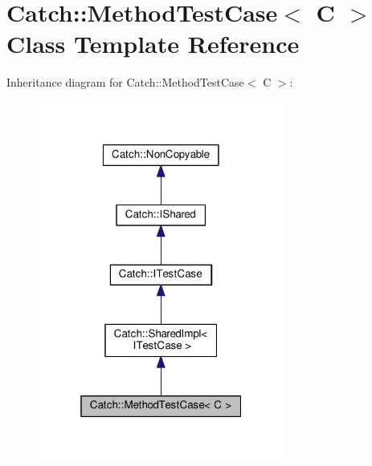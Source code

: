 \hypertarget{classCatch_1_1MethodTestCase}{}\section{Catch\+:\+:Method\+Test\+Case$<$ C $>$ Class Template Reference}
\label{classCatch_1_1MethodTestCase}


Inheritance diagram for Catch\+:\+:Method\+Test\+Case$<$ C $>$\+:
\nopagebreak
\begin{figure}[H]
\begin{center}
\leavevmode
\includegraphics[width=229pt]{classCatch_1_1MethodTestCase__inherit__graph}
\end{center}
\end{figure}


